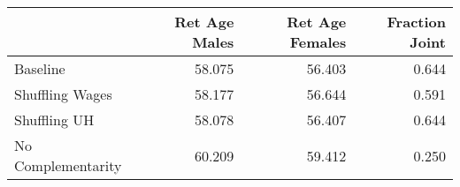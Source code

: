 \begin{tabular}{lrrr}
\toprule
{} & Ret Age Males & Ret Age Females & Fraction Joint \\
\midrule
Baseline           &        58.075 &          56.403 &          0.644 \\
Shuffling Wages    &        58.177 &          56.644 &          0.591 \\
Shuffling UH       &        58.078 &          56.407 &          0.644 \\
No Complementarity &        60.209 &          59.412 &          0.250 \\
\bottomrule
\end{tabular}
